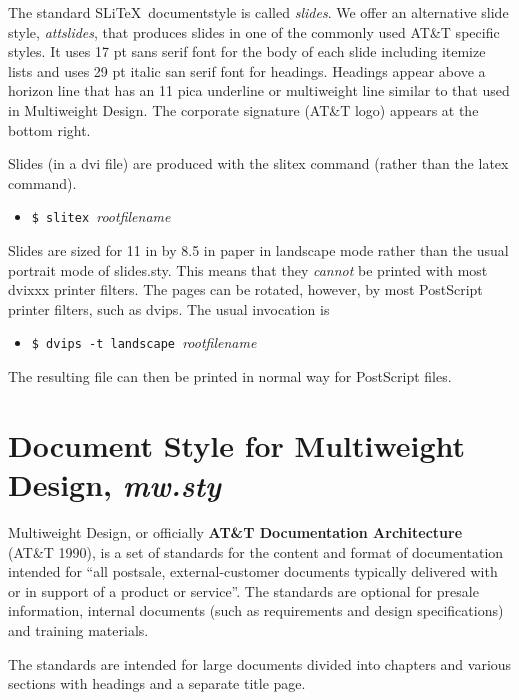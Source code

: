 The standard SLi\TeX\ documentstyle is called {\it slides}.  We offer
an alternative slide style, {\it attslides}, that produces slides in
one of the commonly used AT\&T specific styles.  It uses 17 pt sans
serif font for the body of each slide including itemize lists and uses
29 pt italic san serif font for headings.  Headings appear above a
horizon line that has an 11 pica underline or multiweight line similar
to that used in Multiweight Design.  The corporate signature (AT\&T
logo) appears at the bottom right.

Slides (in a dvi file) are produced with the slitex command (rather
than the latex command). 
\begin{itemize}
\item[]
\verb|$ slitex |{\it rootfilename}
\end{itemize}

Slides are sized for 11 in by 8.5 in paper in landscape mode rather
than the usual portrait mode of slides.sty.  This means that they
{\it cannot} be printed with most dvixxx printer filters.  The pages
can be rotated, however, by most PostScript printer filters, such as
dvips.  The usual invocation is
\begin{itemize}
\item[]
\verb|$ dvips -t landscape |{\it rootfilename}
\end{itemize}
The resulting file can then be printed in normal way for PostScript files.

\part{Document Style for Multiweight Design, {\it mw.sty}}
Multiweight Design, or officially {\bf
AT\&T Documentation Architecture} (AT\&T 1990), is a set of standards
for the content and format of documentation intended for ``all
postsale, external-customer documents typically delivered with or in
support of a product or service''.  The standards are optional for
presale information, internal documents (such as requirements and
design specifications) and training materials.

The standards are intended for large documents divided into chapters
and various sections with headings and a separate title page.  

